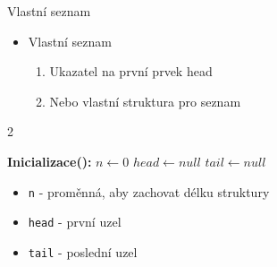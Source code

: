 \documentclass[10pt, hyperref={unicode}]{beamer}
\begin{document}
\begin{frame}{Vlastní seznam}
    \begin{itemize}
        \item Vlastní seznam
        \begin{enumerate}
            \item Ukazatel na první prvek head
            \item Nebo vlastní struktura pro seznam \\
        \end{enumerate}
    \end{itemize}
    \hspace*{15mm}

\begin{multicols}{2}

    \begin{algorithm}[H]

        
            \textbf{Inicializace():} \newline
              $n \leftarrow 0$ \newline
              $head \leftarrow null$ \newline
              $tail \leftarrow null$
            \end{algorithm}

    \begin{algorithm}[H]

              \text{\textcolor{magenta}{typedef struct} \{} \newline
               \newline
               \newline
               \newline
               \text{\} \textcolor{cyan}{linked\_list\_t};}

    \end{algorithm}
\end{multicols}
    
    \begin{itemize}
        \item {\texttt{n} - proměnná, aby zachovat délku struktury}
        \item {\texttt{head} - první uzel}
        \item {\texttt{tail} - poslední uzel}
    \end{itemize}
\end{frame}
\end{document}
